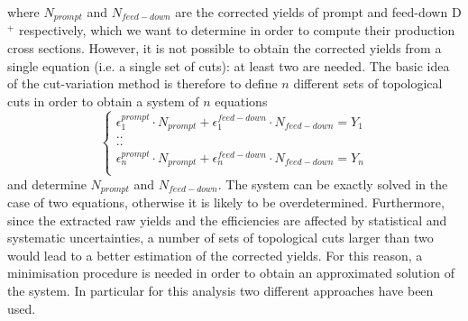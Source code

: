 \documentclass[b5paper,10pt,twoside,oldstyle,classica]{toptesi}
\begin{document}
where $N_{prompt}$ and $N_{feed-down}$ are the corrected yields of prompt and feed-down D$^+$ respectively, which we want to determine in order to compute their production cross sections. However, it is not possible to obtain the corrected yields from a single equation (i.e. a single set of cuts): at least two are needed. The basic idea of the cut-variation method is therefore to define $n$ different sets of topological cuts in order to obtain a system of $n$ equations
\begin{equation}
\begin{cases}
\epsilon^{prompt}_1\cdot N_{prompt} + \epsilon^{feed-down}_1\cdot N_{feed-down} = Y_1\\
..\\
..\\
\epsilon^{prompt}_n\cdot N_{prompt} + \epsilon^{feed-down}_n\cdot N_{feed-down} = Y_n\\
\end{cases}
\label{cutvar_syst}
\end{equation}
and determine $N_{prompt}$ and $N_{feed-down}$. The system can be exactly solved in the case of two equations, otherwise it is likely to be overdetermined. Furthermore, since the extracted raw yields and the efficiencies are affected by statistical and systematic uncertainties, a number of sets of topological cuts larger than two would lead to a better estimation of the corrected yields. For this reason, a minimisation procedure is needed in order to obtain an approximated solution of the system. In particular for this analysis two different approaches have been used.  
\end{document}

